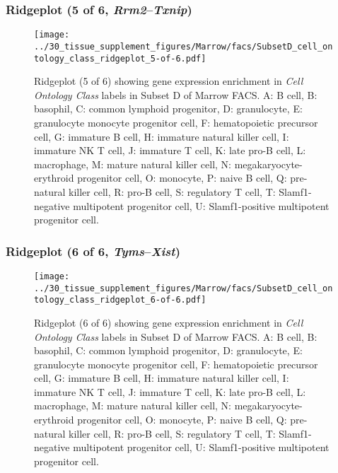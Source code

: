 \subsubsection{Ridgeplot (5 of 6, \emph{Rrm2}--\emph{Txnip})}
\begin{figure}[h]
\centering
\texttt{[image: ../30\_tissue\_supplement\_figures/Marrow/facs/SubsetD\_cell\_ontology\_class\_ridgeplot\_5-of-6.pdf]}

\caption{ Ridgeplot (5 of 6)  showing gene expression enrichment in \emph{Cell Ontology Class} labels in Subset D of Marrow FACS. A: B cell, B: basophil, C: common lymphoid progenitor, D: granulocyte, E: granulocyte monocyte progenitor cell, F: hematopoietic precursor cell, G: immature B cell, H: immature natural killer cell, I: immature NK T cell, J: immature T cell, K: late pro-B cell, L: macrophage, M: mature natural killer cell, N: megakaryocyte-erythroid progenitor cell, O: monocyte, P: naive B cell, Q: pre-natural killer cell, R: pro-B cell, S: regulatory T cell, T: Slamf1-negative multipotent progenitor cell, U: Slamf1-positive multipotent progenitor cell.}
\end{figure}


\clearpage

\subsubsection{Ridgeplot (6 of 6, \emph{Tyms}--\emph{Xist})}
\begin{figure}[h]
\centering
\texttt{[image: ../30\_tissue\_supplement\_figures/Marrow/facs/SubsetD\_cell\_ontology\_class\_ridgeplot\_6-of-6.pdf]}

\caption{ Ridgeplot (6 of 6)  showing gene expression enrichment in \emph{Cell Ontology Class} labels in Subset D of Marrow FACS. A: B cell, B: basophil, C: common lymphoid progenitor, D: granulocyte, E: granulocyte monocyte progenitor cell, F: hematopoietic precursor cell, G: immature B cell, H: immature natural killer cell, I: immature NK T cell, J: immature T cell, K: late pro-B cell, L: macrophage, M: mature natural killer cell, N: megakaryocyte-erythroid progenitor cell, O: monocyte, P: naive B cell, Q: pre-natural killer cell, R: pro-B cell, S: regulatory T cell, T: Slamf1-negative multipotent progenitor cell, U: Slamf1-positive multipotent progenitor cell.}
\end{figure}


\clearpage

